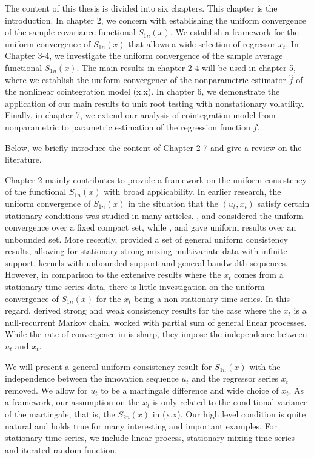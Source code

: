 The content of this thesis is divided into six chapters. This chapter is the introduction. In chapter 2, we concern with establishing the uniform convergence of the sample covariance functional $S_{1n}(x)$. We establish a framework for the uniform convergence of $S_{1n}(x)$ that allows a wide selection of regressor $x_t$. In Chapter 3-4, we investigate the uniform convergence of the sample average functional $S_{1n}(x)$. The main results in chapter 2-4 will be used in chapter 5, where we establish the uniform convergence of the nonparametric estimator $\hat{f}$ of the nonlinear cointegration model (x.x). In chapter 6, we demonstrate the application of our main results to unit root testing with nonstationary volatility. Finally, in chapter 7, we extend our analysis of cointegration model from nonparametric to parametric estimation of the regression function $f$.

Below, we briefly introduce the content of Chapter 2-7 and give a review on the literature. 

Chapter 2 mainly contributes to provide a framework on the uniform consistency of the functional $S_{1n}(x)$ with broad applicability. In earlier research, the uniform convergence of $S_{1n}(x)$ in the situation that the $(u_t, x_t)$ satisfy certain stationary conditions was studied in many articles. \cite{liero}, \cite{peligrad} and \cite{angonze} considered the uniform convergence over a fixed compact set, while \cite{masry}, \cite{bosq} and \cite{fan} gave uniform results over an unbounded set. More recently, \cite{hansen} provided a set of general uniform consistency results, allowing for stationary strong mixing multivariate data with infinite support, kernels with unbounded support and general bandwidth sequences. However, in comparison to the extensive results where the  $x_t$ comes from a stationary time series data, there is little investigation on the uniform convergence of $S_{1n}(x)$ for the $x_t$ being a non-stationary time series. In this regard, \cite{gao3} derived strong and weak consistency results for the case where the $x_t$ is a null-recurrent Markov chain. \cite{wangwang} worked  with partial sum of general linear processes. While the rate of convergence   in \cite{gao3} is sharp,  they impose the independence between $u_t$ and $x_t$.

We will present a general uniform consistency  result for $S_{1n}(x)$ with the independence between the innovation sequence $u_t$ and the regressor series $x_t$ removed. We allow for $u_t$ to be a martingale difference and wide choice of $x_t$. As a framework,  our  assumption on the $x_t$ is only related to the conditional variance of the  martingale, that is, the $S_{2n}(x)$ in (x.x). Our high level condition is quite natural and holds true for many interesting and important examples. For stationary time series, we include linear process, stationary mixing time series and iterated random function.

